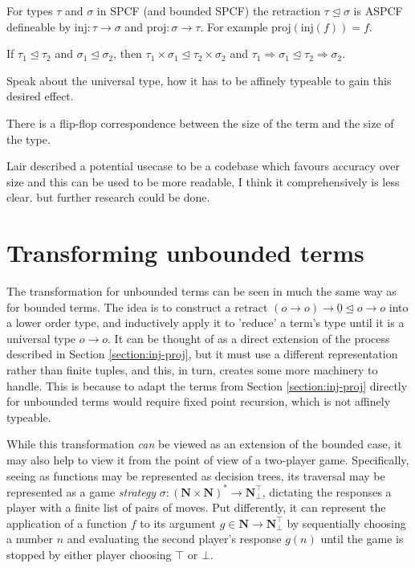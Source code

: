 \documentclass[12pt,a4paper]{report}
\theoremstyle{definition}
\theoremstyle{remark}
\begin{document}
For types $\tau$ and $\sigma$ in SPCF (and bounded SPCF) the retraction $\tau \trianglelefteq \sigma$ is ASPCF defineable by $\text{inj}: \tau \rightarrow \sigma$ and $\text{proj}: \sigma \rightarrow \tau$. For example $\text{proj}(\text{inj}(f))= f$.

If $\tau_1 \trianglelefteq \tau_2$ and $\sigma_1 \trianglelefteq \sigma_2$, then $\tau_1 \times \sigma_1 \trianglelefteq \tau_2 \times \sigma_2$ and $\tau_1 \Rightarrow \sigma_1 \trianglelefteq \tau_2 \Rightarrow \sigma_2 $.

Speak about the universal type, how it has to be affinely typeable to gain this desired effect.

There is a flip-flop correspondence between the size of the term and the size of the type.

Lair described a potential usecase to be a codebase which favours accuracy over size and this can be used to be more readable, I think it comprehensively is less clear. but further research could be done.

\section{Transforming unbounded terms}
The transformation for unbounded terms can be seen in much the same way as for bounded terms. The idea is to construct a retract $(o \rightarrow o) \rightarrow \underline{0} \trianglelefteq o \rightarrow o$ into a lower order type, and inductively apply it to 'reduce' a term's type until it is a universal type $o \rightarrow o$. It can be thought of as a direct extension of the process described in Section \ref{section:inj-proj}, but it must use a different representation rather than finite tuples, and this, in turn, creates some more machinery to handle. This is because to adapt the terms from Section \ref{section:inj-proj} directly for unbounded terms would require fixed point recursion, which is not affinely typeable.

While this transformation \emph{can} be viewed as an extension of the bounded case, it may also help to view it from the point of view of a two-player game. Specifically, seeing as functions may be represented as decision trees, its traversal may be represented as a game \emph{strategy} $\sigma : (\textbf{N} \times \textbf{N})^* \rightarrow \textbf{N}_\bot^\top$, dictating the responses a player with a finite list of pairs of moves. Put differently, it can represent the application of a function $f$ to its argument $g \in \textbf{N}\rightarrow \textbf{N}_\bot^\top$ by sequentially choosing a number $n$ and evaluating the second player's response $g(n)$ until the game is stopped by either player choosing $\top$ or $\bot$.
\end{document}
